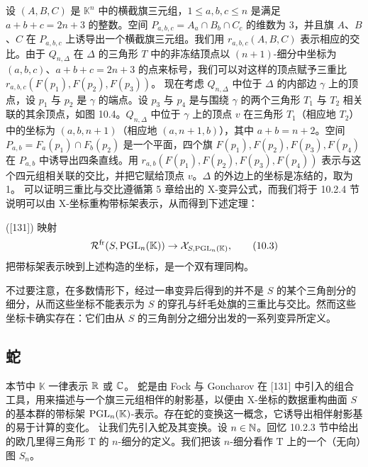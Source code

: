 设 $(A,B,C)$ 是 $\mathbb{K}^n$ 中的横截旗三元组，$1\le a,b,c\le n$ 是满足 $a+b+c=2n+3$ 的整数。空间 $P_{a,b,c}=A_a\cap B_b\cap C_c$ 的维数为 3，并且旗 $A$、$B$、$C$ 在 $P_{a,b,c}$ 上诱导出一个横截旗三元组。我们用 $r_{a,b,c}(A,B,C)$ 表示相应的交比。由于 $Q_{n,\Delta}$ 在 $\Delta$ 的三角形 $T$ 中的非冻结顶点以 $(n+1)$-细分中坐标为 $(a,b,c)$、$a+b+c=2n+3$ 的点来标号，我们可以对这样的顶点赋予三重比 $r_{a,b,c}(F(p_1),F(p_2),F(p_3))$。
现在考虑 $Q_{n,\Delta}$ 中位于 $\Delta$ 的内部边 $\gamma$ 上的顶点，设 $p_1$ 与 $p_2$ 是 $\gamma$ 的端点。设 $p_3$ 与 $p_4$ 是与围绕 $\gamma$ 的两个三角形 $T_1$ 与 $T_2$ 相关联的其余顶点，如图 10.4。$Q_{n,\Delta}$ 中位于 $\gamma$ 上的顶点 $v$ 在三角形 $T_1$（相应地 $T_2$）中的坐标为 $(a,b,n+1)$（相应地 $(a,n+1,b)$），其中 $a+b=n+2$。空间 $P_{a,b}=F_a(p_1)\cap F_b(p_2)$ 是一个平面，四个旗 $F(p_1),F(p_2),F(p_3),F(p_4)$ 在 $P_{a,b}$ 中诱导出四条直线。用 $r_{a,b}(F(p_1),F(p_2),F(p_3),F(p_4))$ 表示与这个四元组相关联的交比，并把它赋给顶点 $v$。$\Delta$ 的外边上的坐标是冻结的，取为 1。
可以证明三重比与交比遵循第 5 章给出的 X-变异公式，而我们将于 10.2.4 节说明可以由 X-坐标重构带标架表示，从而得到下述定理：


\begin{theorem}[10.23] ([131]) 映射
\begin{equation}
\mathcal{R}^{\mathrm{fr}}(S,\operatorname{PGL}_n(\mathbb{K}))\to\mathcal{X}_{S,\operatorname{PGL}_n(\mathbb{K})}, \tag{10.3}
\end{equation}
把带标架表示映到上述构造的坐标，是一个双有理同构。
\end{theorem}

不过要注意，在多数情形下，经过一串变异后得到的并不是 $S$ 的某个三角剖分的细分，从而这些坐标不能表示为 $S$ 的穿孔与纤毛处旗的三重比与交比。然而这些坐标卡确实存在：它们由从 $S$ 的三角剖分之细分出发的一系列变异所定义。

\subsection{蛇}

本节中 $\mathbb{K}$ 一律表示 $\mathbb{R}$ 或 $\mathbb{C}$。
蛇是由 Fock 与 Goncharov 在 [131] 中引入的组合工具，用来描述与一个旗三元组相伴的射影基，以便由 X-坐标的数据重构曲面 $S$ 的基本群的带标架 $\operatorname{PGL}_n(\mathbb{K})$-表示。存在蛇的变换这一概念，它诱导出相伴射影基的易于计算的变化。
让我们先引入蛇及其变换。设 $n\in\mathbb{N}$。回忆 10.2.3 节中给出的欧几里得三角形 $\mathrm{T}$ 的 $n$-细分的定义。我们把该 $n$-细分看作 $\mathrm{T}$ 上的一个（无向）图 $S_n$。

